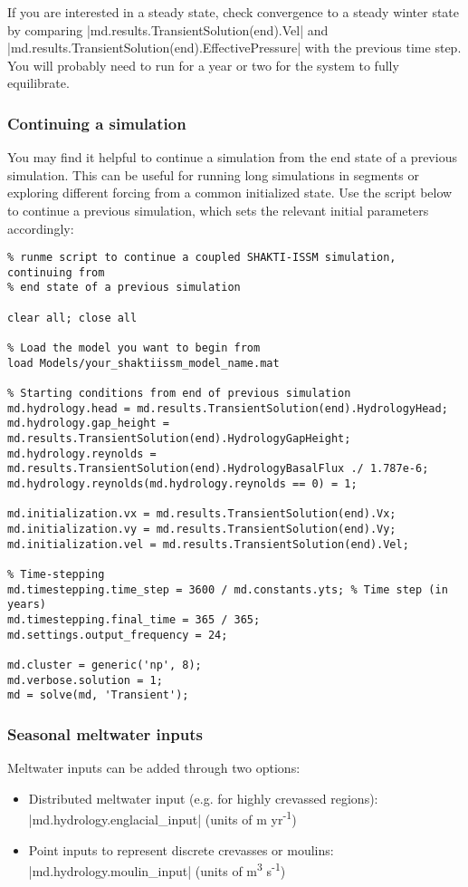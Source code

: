If you are interested in a steady state, check convergence to a steady winter state by comparing \lstinlinebg|md.results.TransientSolution(end).Vel| and \lstinlinebg|md.results.TransientSolution(end).EffectivePressure| with the previous time step. You will probably need to run for a year or two for the system to fully equilibrate.

\subsubsection{Continuing a simulation}
You may find it helpful to continue a simulation from the end state of a previous simulation. This can be useful for running long simulations in segments or exploring different forcing from a common initialized state. Use the script below to continue a previous simulation, which sets the relevant initial parameters accordingly:

\begin{lstlisting}
% runme script to continue a coupled SHAKTI-ISSM simulation, continuing from
% end state of a previous simulation

clear all; close all

% Load the model you want to begin from
load Models/your_shaktiissm_model_name.mat

% Starting conditions from end of previous simulation
md.hydrology.head = md.results.TransientSolution(end).HydrologyHead;
md.hydrology.gap_height = md.results.TransientSolution(end).HydrologyGapHeight;
md.hydrology.reynolds = md.results.TransientSolution(end).HydrologyBasalFlux ./ 1.787e-6;
md.hydrology.reynolds(md.hydrology.reynolds == 0) = 1;

md.initialization.vx = md.results.TransientSolution(end).Vx;
md.initialization.vy = md.results.TransientSolution(end).Vy;
md.initialization.vel = md.results.TransientSolution(end).Vel;

% Time-stepping
md.timestepping.time_step = 3600 / md.constants.yts; % Time step (in years)
md.timestepping.final_time = 365 / 365;
md.settings.output_frequency = 24;

md.cluster = generic('np', 8);
md.verbose.solution = 1;
md = solve(md, 'Transient');
\end{lstlisting}

\subsubsection{Seasonal meltwater inputs}
Meltwater inputs can be added through two options:
\begin{itemize}
	\item Distributed meltwater input (e.g. for highly crevassed regions): \lstinlinebg|md.hydrology.englacial_input| (units of m yr\textsuperscript{-1})
	\item Point inputs to represent discrete crevasses or moulins: \lstinlinebg|md.hydrology.moulin_input| (units of m\textsuperscript{3} s\textsuperscript{-1})
\end{itemize}

